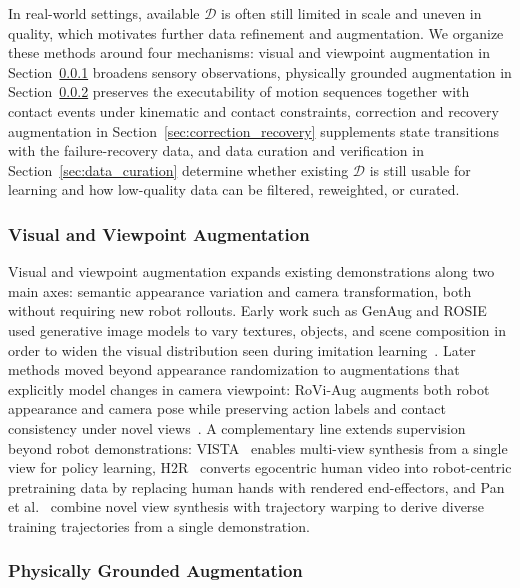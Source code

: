 \documentclass[acmsmall,screen,review]{acmart}
\begin{document}
In real-world settings, available \(\mathcal{D}\) is often still limited in scale and uneven in quality, which motivates further data refinement and augmentation. 
We organize these methods around four mechanisms: visual and viewpoint augmentation in Section~\ref{sec:trajectory_redrawing} broadens sensory observations, 
physically grounded augmentation in Section~\ref{sec:dynamics_constraints} preserves the executability of motion sequences together with contact events under kinematic and contact constraints, 
correction and recovery augmentation in Section~\ref{sec:correction_recovery} supplements state transitions with the failure-recovery data, 
and data curation and verification in Section~\ref{sec:data_curation} determine whether existing \(\mathcal{D}\) is still usable for learning and how low-quality data can be filtered, reweighted, or curated. 

\subsubsection{Visual and Viewpoint Augmentation}\label{sec:trajectory_redrawing}

Visual and viewpoint augmentation expands existing demonstrations along two main axes: semantic appearance variation and camera transformation, both without requiring new robot rollouts. 
Early work such as GenAug and ROSIE used generative image models to vary textures, objects, and scene composition in order to widen the visual distribution seen during imitation learning~\cite{chen2023genaug, yu2023scalingrobotlearningsemantically}. 
Later methods moved beyond appearance randomization to augmentations that explicitly model changes in camera viewpoint: RoVi-Aug augments both robot appearance and camera pose while preserving action labels and contact consistency under novel views~\cite{chen2025roviaug}. 
A complementary line extends supervision beyond robot demonstrations: VISTA~\cite{wang2024vista} enables multi-view synthesis from a single view for policy learning, H2R~\cite{li2025h2r} converts egocentric human video into robot-centric pretraining data by replacing human hands with rendered end-effectors, and Pan et al.~\cite{pan2025one} combine novel view synthesis with trajectory warping to derive diverse training trajectories from a single demonstration.

\subsubsection{Physically Grounded Augmentation}\label{sec:dynamics_constraints}
\end{document}
